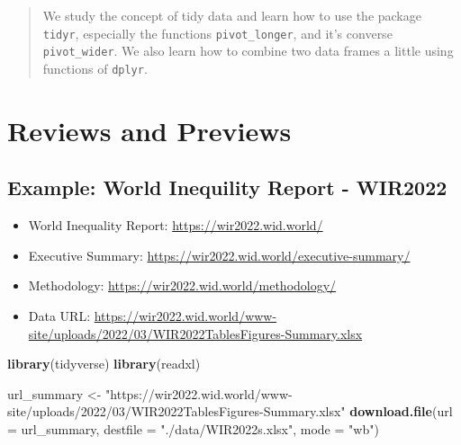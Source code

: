 \documentclass[
  xelatex, ja=standard]{bxjsbook}
\newenvironment{Shaded}{\begin{snugshade}}{\end{snugshade}}
\newcommand{\AttributeTok}[1]{\textcolor[rgb]{0.13,0.29,0.53}{#1}}
\newcommand{\FunctionTok}[1]{\textcolor[rgb]{0.13,0.29,0.53}{\textbf{#1}}}
\newcommand{\NormalTok}[1]{#1}
\newcommand{\OtherTok}[1]{\textcolor[rgb]{0.56,0.35,0.01}{#1}}
\newcommand{\StringTok}[1]{\textcolor[rgb]{0.31,0.60,0.02}{#1}}
\providecommand{\tightlist}{%
  \setlength{\itemsep}{0pt}\setlength{\parskip}{0pt}}
\theoremstyle{definition}
\theoremstyle{definition}
\theoremstyle{definition}
\theoremstyle{definition}
\theoremstyle{remark}
\begin{document}
\begin{quote}
We study the concept of tidy data and learn how to use the package \texttt{tidyr}, especially the functions \texttt{pivot\_longer}, and it's converse \texttt{pivot\_wider}. We also learn how to combine two data frames a little using functions of \texttt{dplyr}.
\end{quote}

\hypertarget{reviews-and-previews}{%
\section{Reviews and Previews}\label{reviews-and-previews}}

\hypertarget{example-world-inequility-report---wir2022}{%
\subsection{Example: World Inequility Report - WIR2022}\label{example-world-inequility-report---wir2022}}

\begin{itemize}
\tightlist
\item
  World Inequality Report: \url{https://wir2022.wid.world/}
\item
  Executive Summary: \url{https://wir2022.wid.world/executive-summary/}
\item
  Methodology: \url{https://wir2022.wid.world/methodology/}
\item
  Data URL: \url{https://wir2022.wid.world/www-site/uploads/2022/03/WIR2022TablesFigures-Summary.xlsx}
\end{itemize}

\begin{Shaded}
\begin{Highlighting}[]
\FunctionTok{library}\NormalTok{(tidyverse)}
\FunctionTok{library}\NormalTok{(readxl)}
\end{Highlighting}
\end{Shaded}

\begin{Shaded}
\begin{Highlighting}[]
\NormalTok{url\_summary }\OtherTok{\textless{}{-}} \StringTok{"https://wir2022.wid.world/www{-}site/uploads/2022/03/WIR2022TablesFigures{-}Summary.xlsx"}
\FunctionTok{download.file}\NormalTok{(}\AttributeTok{url =}\NormalTok{ url\_summary, }\AttributeTok{destfile =} \StringTok{"./data/WIR2022s.xlsx"}\NormalTok{, }\AttributeTok{mode =} \StringTok{"wb"}\NormalTok{) }
\end{Highlighting}
\end{Shaded}
\end{document}
